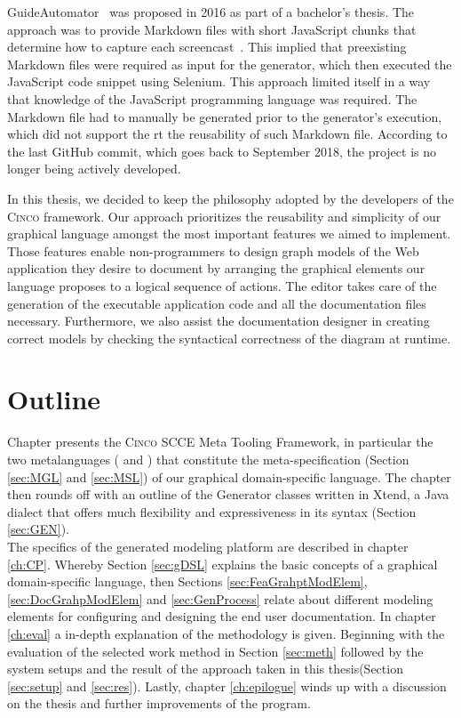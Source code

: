 GuideAutomator~\cite{oliveira2016guideautomator} was proposed in 2016 as part of a bachelor's thesis. The approach was to provide Markdown files with short JavaScript chunks that determine how to capture each screencast~\cite{guidAutomatorGitHub}. This implied that preexisting Markdown files were required as input for the generator, which then executed the JavaScript code snippet using Selenium. This approach limited itself in a way that knowledge of the JavaScript programming language was required. The Markdown file had to manually be generated prior to the generator's execution, which did not support the rt the reusability of such Markdown file. According to the last GitHub commit, which goes back to September 2018, the project is no longer being actively developed.

In this thesis, we decided to keep the philosophy adopted by the developers of the \textsc{Cinco} framework. Our approach prioritizes the reusability and simplicity of our graphical language amongst the most important features we aimed to implement. Those features enable non-programmers to design graph models of the Web application they desire to document by arranging the graphical elements our language proposes to a logical sequence of actions. The editor takes care of the generation of the executable application code and all the documentation files necessary. Furthermore, we also assist the documentation designer in creating correct models by checking the syntactical correctness of the diagram at runtime.

\section{Outline}\label{sec:outline}

Chapter  presents the \textsc{Cinco} SCCE Meta Tooling Framework, in particular the two metalanguages ( and ) that constitute the meta-specification (Section \ref{sec:MGL} and \ref{sec:MSL}) of our graphical domain-specific language. The chapter then rounds off with an outline of the Generator classes written in Xtend, a Java dialect that offers much flexibility and expressiveness in its syntax (Section \ref{sec:GEN}).\\The specifics of the generated modeling platform are described in chapter \ref{ch:CP}. Whereby Section \ref{sec:gDSL} explains the basic concepts of a graphical domain-specific language, then Sections \ref{sec:FeaGrahptModElem}, \ref{sec:DocGrahpModElem} and \ref{sec:GenProcess} relate about different modeling elements for configuring and designing the end user documentation. In chapter \ref{ch:eval} a in-depth explanation of the methodology is given. Beginning with the evaluation of the selected work method in Section \ref{sec:meth} followed by the system setups and the result of the approach taken in this thesis(Section \ref{sec:setup} and \ref{sec:res}). Lastly, chapter \ref{ch:epilogue} winds up with a discussion on the thesis and further improvements of the program.